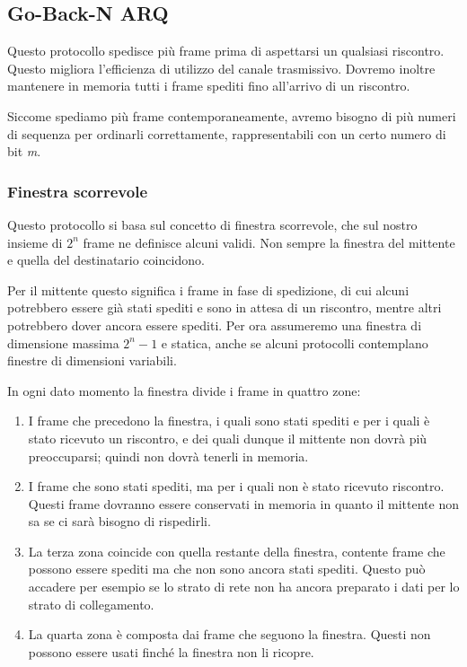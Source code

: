     \subsection{Go-Back-N ARQ}
        Questo protocollo spedisce più frame prima di aspettarsi un qualsiasi riscontro. Questo migliora l'efficienza di utilizzo del canale trasmissivo. Dovremo inoltre mantenere in memoria tutti i frame spediti fino all'arrivo di un riscontro.
        
        Siccome spediamo più frame contemporaneamente, avremo bisogno di più numeri di sequenza per ordinarli correttamente, rappresentabili con un certo numero di bit \textit{m}.
        
        \subsubsection{Finestra scorrevole}
            Questo protocollo si basa sul concetto di finestra scorrevole, che sul nostro insieme di $2^n$ frame ne definisce alcuni validi. Non sempre la finestra del mittente e quella del destinatario coincidono.
            
            Per il mittente questo significa i frame in fase di spedizione, di cui alcuni potrebbero essere già stati spediti e sono in attesa di un riscontro, mentre altri potrebbero dover ancora essere spediti. Per ora assumeremo una finestra di dimensione massima $2^n - 1$ e statica, anche se alcuni protocolli contemplano finestre di dimensioni variabili.
            
            In ogni dato momento la finestra divide i frame in quattro zone:
            \begin{enumerate}
                \item I frame che precedono la finestra, i quali sono stati spediti e per i quali è stato ricevuto un riscontro, e dei quali dunque il mittente non dovrà più preoccuparsi; quindi non dovrà tenerli in memoria.
                
                \item I frame che sono stati spediti, ma per i quali non è stato ricevuto riscontro. Questi frame dovranno essere conservati in memoria in quanto il mittente non sa se ci sarà bisogno di rispedirli.
                
                \item La terza zona coincide con quella restante della finestra, contente frame che possono essere spediti ma che non sono ancora stati spediti. Questo può accadere per esempio se lo strato di rete non ha ancora preparato i dati per lo strato di collegamento.
                
                \item La quarta zona è composta dai frame che seguono la finestra. Questi non possono essere usati finché la finestra non li ricopre.
            \end{enumerate}
            
